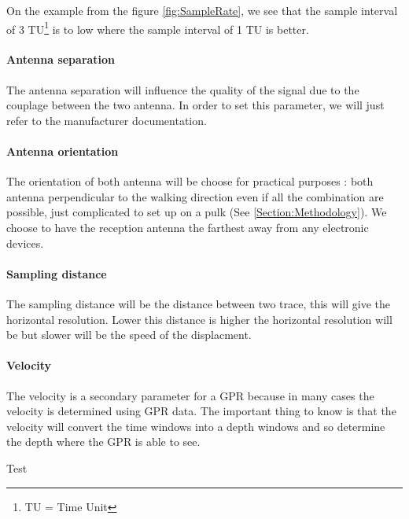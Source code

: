 On the example from the figure \ref{fig:SampleRate}, we see that the sample interval of 3 TU\footnote{TU = Time Unit} is to low where the sample interval of 1 TU is better.

\paragraph{Antenna separation} The antenna separation will influence the quality of the signal due to the couplage between the two antenna. In order to set this parameter, we will just refer to the manufacturer documentation.

\paragraph{Antenna orientation} The orientation of both antenna will be choose for practical purposes : both antenna perpendicular to the walking direction even if all the combination are possible, just complicated to set up on a pulk (See \ref{Section:Methodology}). We choose to have the reception antenna the farthest away from any electronic devices.


\paragraph{Sampling distance} The sampling distance will be the distance between two trace, this will give the horizontal resolution. Lower this distance is higher the horizontal resolution will be but slower will be the speed of the displacment.

\paragraph{Velocity} The velocity is a secondary parameter for a GPR because in many cases the velocity is determined using GPR data. The important thing to know is that the velocity will convert the time windows into a depth windows and so determine the depth where the GPR is able to see.

Test


